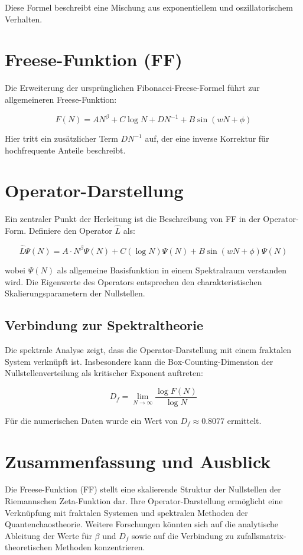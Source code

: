 \documentclass[a4paper,12pt]{article}
\begin{document}
Diese Formel beschreibt eine Mischung aus exponentiellem und oszillatorischem Verhalten.

\section{Freese-Funktion (FF)}

Die Erweiterung der ursprünglichen Fibonacci-Freese-Formel führt zur allgemeineren Freese-Funktion:

\begin{equation}
    F(N) = A N^{\beta} + C \log N + D N^{-1} + B \sin(wN + \phi)
\end{equation}

Hier tritt ein zusätzlicher Term $D N^{-1}$ auf, der eine inverse Korrektur für hochfrequente Anteile beschreibt.

\section{Operator-Darstellung}

Ein zentraler Punkt der Herleitung ist die Beschreibung von FF in der Operator-Form. Definiere den Operator $\hat{L}$ als:

\begin{equation}
    \hat{L} \Psi(N) = A \cdot N^{\beta} \Psi(N) + C (\log N) \Psi(N) + B \sin(wN + \phi) \Psi(N)
\end{equation}

wobei $\Psi(N)$ als allgemeine Basisfunktion in einem Spektralraum verstanden wird. Die Eigenwerte des Operators entsprechen den charakteristischen Skalierungsparametern der Nullstellen.

\subsection{Verbindung zur Spektraltheorie}

Die spektrale Analyse zeigt, dass die Operator-Darstellung mit einem fraktalen System verknüpft ist. Insbesondere kann die Box-Counting-Dimension der Nullstellenverteilung als kritischer Exponent auftreten:

\begin{equation}
    D_f = \lim_{N \to \infty} \frac{\log F(N)}{\log N}
\end{equation}

Für die numerischen Daten wurde ein Wert von $D_f \approx 0.8077$ ermittelt.

\section{Zusammenfassung und Ausblick}

Die Freese-Funktion (FF) stellt eine skalierende Struktur der Nullstellen der Riemannschen Zeta-Funktion dar. Ihre Operator-Darstellung ermöglicht eine Verknüpfung mit fraktalen Systemen und spektralen Methoden der Quantenchaostheorie. Weitere Forschungen könnten sich auf die analytische Ableitung der Werte für $\beta$ und $D_f$ sowie auf die Verbindung zu zufallsmatrix-theoretischen Methoden konzentrieren.
\end{document}

